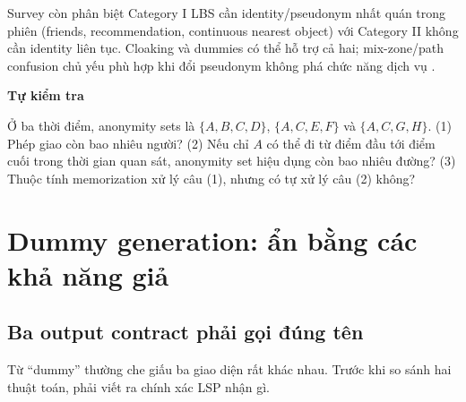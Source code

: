 \documentclass[11pt,a4paper,oneside]{report}
\newenvironment{exercisebox}[1][Tự kiểm tra]{%
  \par\medskip\noindent\begin{lrbox}{\exercisestore}\begin{minipage}{.89\textwidth}
  {\sffamily\bfseries\color{amber}#1}\par\smallskip}{%
  \end{minipage}\end{lrbox}\begin{center}\setlength{\fboxsep}{7pt}%
  \fcolorbox{amber}{lightamber}{\usebox{\exercisestore}}\end{center}\medskip}
\begin{document}
Survey còn phân biệt Category I LBS cần identity/pseudonym nhất quán trong phiên
(friends, recommendation, continuous nearest object) với Category II không cần
identity liên tục. Cloaking và dummies có thể hỗ trợ cả hai; mix-zone/path confusion
chủ yếu phù hợp khi đổi pseudonym không phá chức năng dịch vụ
\cite{chow2011trajectory}.

\begin{exercisebox}
Ở ba thời điểm, anonymity sets là $\{A,B,C,D\}$, $\{A,C,E,F\}$ và
$\{A,C,G,H\}$. (1) Phép giao còn bao nhiêu người? (2) Nếu chỉ $A$ có thể đi từ
điểm đầu tới điểm cuối trong thời gian quan sát, anonymity set hiệu dụng còn bao
nhiêu đường? (3) Thuộc tính memorization xử lý câu (1), nhưng có tự xử lý câu (2)
không?
\end{exercisebox}


\chapter{Dummy generation: ẩn bằng các khả năng giả}

\section{Ba output contract phải gọi đúng tên}

Từ ``dummy'' thường che giấu ba giao diện rất khác nhau. Trước khi so sánh hai
thuật toán, phải viết ra chính xác LSP nhận gì.
\end{document}
